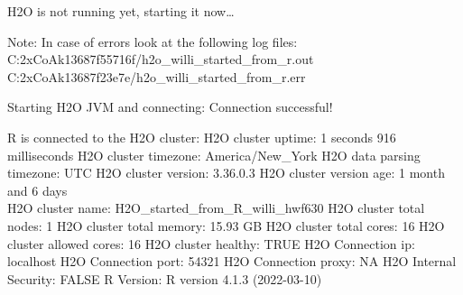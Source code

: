 \documentclass[
]{article}
\begin{document}
H2O is not running yet, starting it now\ldots{}

Note: In case of errors look at the following log files:
C:\Users\willi\AppData\Local\Temp\Rtmp2xCoAk\file13687f55716f/h2o\_willi\_started\_from\_r.out
C:\Users\willi\AppData\Local\Temp\Rtmp2xCoAk\file13687f23e7e/h2o\_willi\_started\_from\_r.err

Starting H2O JVM and connecting: Connection successful!

R is connected to the H2O cluster: H2O cluster uptime: 1 seconds 916
milliseconds H2O cluster timezone: America/New\_York H2O data parsing
timezone: UTC H2O cluster version: 3.36.0.3 H2O cluster version age: 1
month and 6 days\\
H2O cluster name: H2O\_started\_from\_R\_willi\_hwf630 H2O cluster total
nodes: 1 H2O cluster total memory: 15.93 GB H2O cluster total cores: 16
H2O cluster allowed cores: 16 H2O cluster healthy: TRUE H2O Connection
ip: localhost H2O Connection port: 54321 H2O Connection proxy: NA H2O
Internal Security: FALSE R Version: R version 4.1.3 (2022-03-10)
\end{document}
